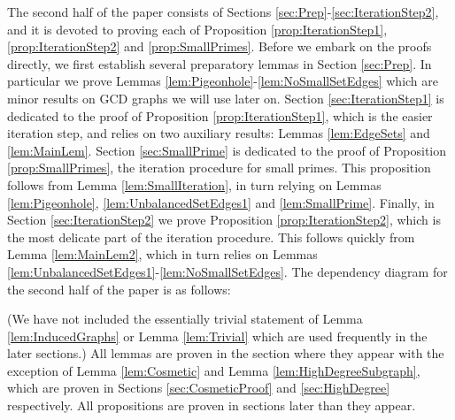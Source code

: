 \documentclass[12pt]{amsart}
\numberwithin{equation}{section}
\theoremstyle{definition}
\theoremstyle{remark}
\begin{document}
\medskip

The second half of the paper consists of Sections \ref{sec:Prep}-\ref{sec:IterationStep2}, and it is devoted to proving each of Proposition \ref{prop:IterationStep1}, \ref{prop:IterationStep2} and \ref{prop:SmallPrimes}. Before we embark on the proofs directly, we first establish several preparatory lemmas in Section \ref{sec:Prep}. In particular we prove Lemmas \ref{lem:Pigeonhole}-\ref{lem:NoSmallSetEdges} which are minor results on GCD graphs we will use later on. Section \ref{sec:IterationStep1} is dedicated to the proof of Proposition \ref{prop:IterationStep1}, which is the easier iteration step, and relies on two auxiliary results: Lemmas  \ref{lem:EdgeSets} and \ref{lem:MainLem}. Section \ref{sec:SmallPrime} is dedicated to the proof of Proposition \ref{prop:SmallPrimes}, the iteration procedure for small primes. This proposition follows from Lemma \ref{lem:SmallIteration}, in turn relying on Lemmas \ref{lem:Pigeonhole}, \ref{lem:UnbalancedSetEdges1} and \ref{lem:SmallPrime}. Finally, in Section \ref{sec:IterationStep2} we prove Proposition \ref{prop:IterationStep2}, which is the most delicate part of the iteration procedure. This follows quickly from Lemma \ref{lem:MainLem2}, which in turn relies on Lemmas \ref{lem:UnbalancedSetEdges1}-\ref{lem:NoSmallSetEdges}. The dependency diagram for the second half of the paper is as follows:


%
%
%
%
%
%

\smallskip


  \begin{center}
   \end{center}

%
%

\smallskip

(We have not included the essentially trivial statement of Lemma \ref{lem:InducedGraphs} or Lemma \ref{lem:Trivial} which are used frequently in the later sections.) All lemmas are proven in the section where they appear with the exception of Lemma \ref{lem:Cosmetic} and Lemma \ref{lem:HighDegreeSubgraph}, which are proven in Sections \ref{sec:CosmeticProof} and \ref{sec:HighDegree} respectively. All propositions are proven in sections later than they appear.
\end{document}
